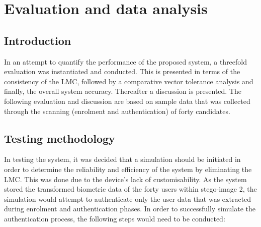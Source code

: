 \chapter{Evaluation and data analysis}


\section{Introduction}

In an attempt to quantify the performance of the proposed system, a threefold evaluation was instantiated and conducted. This is presented in terms of the consistency of the LMC, followed by a comparative vector tolerance analysis and finally, the overall system accuracy. Thereafter a discussion is presented. The following evaluation and discussion are based on sample data that was collected through the scanning (enrolment and authentication) of forty candidates.

\section{Testing methodology}


In testing the system, it was decided that a simulation should be initiated in order to determine the reliability and efficiency of the system by eliminating the LMC. This was done due to the device's lack of customisability. As the system stored the transformed biometric data of the forty users within stego-image 2, the simulation would attempt to authenticate only the user data that was extracted during enrolment and authentication phases. In order to successfully simulate the authentication process, the following steps would need to be conducted: 

